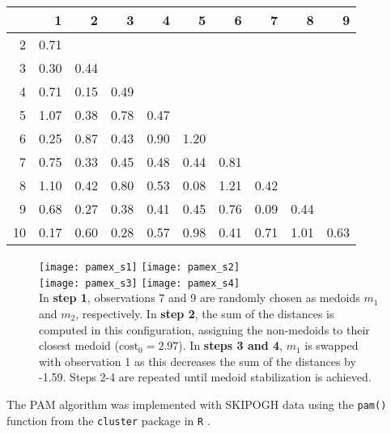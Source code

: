 \begin{table}
\centering
{}
\begin{tabular}{ r | rrrrrrrrr}
\toprule
     & 1  &  2  &  3  &  4   & 5  &  6  &  7    &8  &  9 \\
\midrule
2&  0.71      \\                                   
3 & 0.30& 0.44        \\                            
4  &0.71& 0.15& 0.49       \\                        
5 & 1.07 &0.38 &0.78& 0.47    \\                     
6 & 0.25& 0.87& 0.43& 0.90 &1.20       \\              
7 & 0.75& 0.33& 0.45 &0.48& 0.44& 0.81        \\
8 & 1.10 &0.42& 0.80 &0.53& 0.08&1.21 &0.42           \\
9 & 0.68 &0.27& 0.38 &0.41& 0.45&0.76 &0.09 &0.44      \\
10& 0.17& 0.60& 0.28 &0.57& 0.98 &0.41 &0.71 &1.01& 0.63 \\
\bottomrule
\end{tabular}
\label{table:distmex}
\end{table}

\begin{figure}
\captionsetup{singlelinecheck = false, format= hang, justification=raggedright, font=small, labelsep=space}
\texttt{[image: pamex\_s1]} \hfill
\texttt{[image: pamex\_s2]} \\
\texttt{[image: pamex\_s3]} \hfill
\texttt{[image: pamex\_s4]} \\
\label{fig:pamex2}
{\footnotesize In \textbf{step 1}, observations 7 and 9 are randomly chosen as medoids $m_1$ and $m_2$, respectively. In \textbf{step 2}, the sum of the distances is computed in this configuration, assigning the non-medoids to their closest medoid ($\text{cost}_0 = 2.97$). In \textbf{steps 3 and 4}, $m_1$ is swapped with observation 1 as this decreases the sum of the distances by -1.59. Steps 2-4 are repeated until medoid stabilization is achieved.}
\end{figure}

The PAM algorithm was implemented with SKIPOGH data using the \texttt{pam()} function from the \texttt{cluster} package in \texttt{R} \cite{rblog}.

